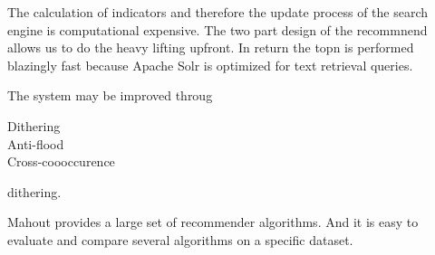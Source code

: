 The calculation of indicators and therefore the update process of the search engine is computational expensive. The two part design of the recommnend allows us to do the heavy lifting upfront. In return the \gls{topn} is performed blazingly fast because Apache Solr is optimized for text retrieval queries. 

The system may be improved throug 
\begin{description}
\item[Dithering] 
\item[Anti-flood] 
\item[Cross-coooccurence]
\end{description}
dithering.

Mahout provides a large set of recommender algorithms. And it is easy to evaluate and compare several algorithms on a specific dataset.
